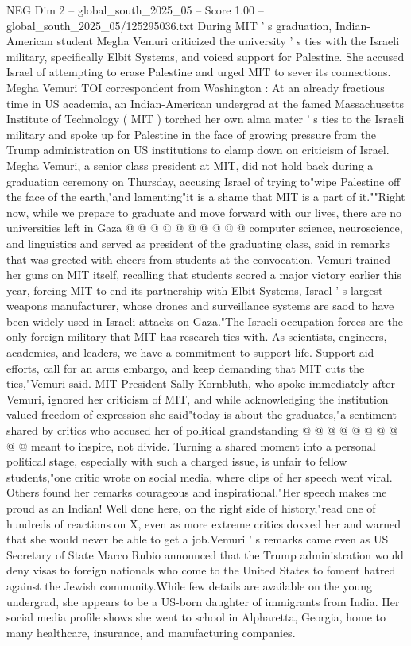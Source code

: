 \begin{textsample}{NEG Dim 2 – global\_south\_2025\_05 – Score 1.00 – global\_south\_2025\_05/125295036.txt}  \label{ex:f2_neg_400}
During MIT ' s graduation, Indian-American student Megha Vemuri criticized the university ' s ties with the Israeli military, specifically Elbit Systems, and voiced support for Palestine.
She accused Israel of attempting to erase Palestine and urged MIT to sever its connections.
Megha Vemuri TOI correspondent from Washington : At an already fractious time in US academia, an Indian-American undergrad at the famed Massachusetts Institute of Technology ( MIT ) torched her own alma mater ' s ties to the Israeli military and spoke up for Palestine in the face of growing pressure from the Trump administration on US institutions to clamp down on criticism of Israel.
Megha Vemuri, a senior class president at MIT, did not hold back during a graduation ceremony on Thursday, accusing Israel of trying to"wipe Palestine off the face of the earth,"and lamenting"it is a shame that MIT is a part of it.""Right now, while we prepare to graduate and move forward with our lives, there are no universities left in Gaza @ @ @ @ @ @ @ @ @ @ computer science, neuroscience, and linguistics and served as president of the graduating class, said in remarks that was greeted with cheers from students at the convocation.
Vemuri trained her guns on MIT itself, recalling that students scored a major victory earlier this year, forcing MIT to end its partnership with Elbit Systems, Israel ' s largest weapons manufacturer, whose drones and surveillance systems are saod to have been widely used in Israeli attacks on Gaza."The Israeli occupation forces are the only foreign military that MIT has research ties with.
As scientists, engineers, academics, and leaders, we have a commitment to support life.
Support aid efforts, call for an arms embargo, and keep demanding that MIT cuts the ties,"Vemuri said.
MIT President Sally Kornbluth, who spoke immediately after Vemuri, ignored her criticism of MIT, and while acknowledging the institution valued freedom of expression she said"today is about the graduates,"a sentiment shared by critics who accused her of political grandstanding @ @ @ @ @ @ @ @ @ @ meant to inspire, not divide.
Turning a shared moment into a personal political stage, especially with such a charged issue, is unfair to fellow students,"one critic wrote on social media, where clips of her speech went viral.
Others found her remarks courageous and inspirational."Her speech makes me proud as an Indian!
Well done here, on the right side of history,"read one of hundreds of reactions on X, even as more extreme critics doxxed her and warned that she would never be able to get a job.Vemuri ' s remarks came even as US Secretary of State Marco Rubio announced that the Trump administration would deny visas to foreign nationals who come to the United States to foment hatred against the Jewish community.While few details are available on the young undergrad, she appears to be a US-born daughter of immigrants from India.
Her social media profile shows she went to school in Alpharetta, Georgia, home to many healthcare, insurance, and manufacturing companies.

\end{textsample}
